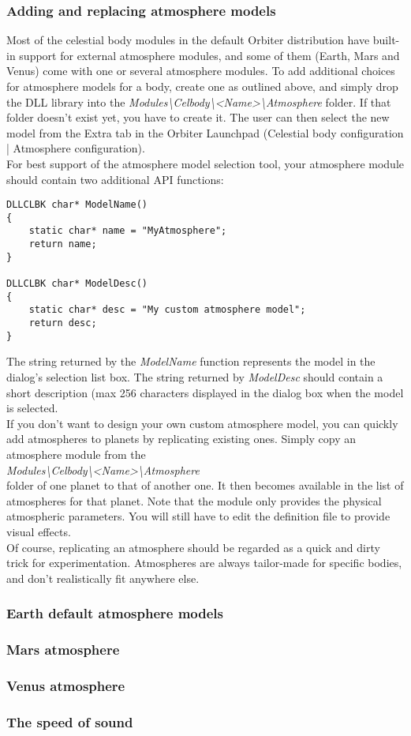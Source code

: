\documentclass[Orbiter Developer Manual.tex]{subfiles}
\begin{document}
\subsubsection{Adding and replacing atmosphere models}
Most of the celestial body modules in the default Orbiter distribution have built-in support for external atmosphere modules, and some of them (Earth, Mars and Venus) come with one or several atmosphere modules. To add additional choices for atmosphere models for a body, create one as outlined above, and simply drop the DLL library into the \textit{Modules\textbackslash Celbody\textbackslash <Name>\textbackslash Atmosphere} folder. If that folder doesn't exist yet, you have to create it. The user can then select the new model from the Extra tab in the Orbiter Launchpad (Celestial body configuration | Atmosphere configuration).\\
For best support of the atmosphere model selection tool, your atmosphere module should contain two additional API functions:

\begin{lstlisting}
DLLCLBK char* ModelName()
{
	static char* name = "MyAtmosphere";
	return name;
}

DLLCLBK char* ModelDesc()
{
	static char* desc = "My custom atmosphere model";
	return desc;
}
\end{lstlisting}

\noindent
The string returned by the \textit{ModelName} function represents the model in the dialog's selection list box. The string returned by \textit{ModelDesc} should contain a short description (max 256 characters displayed in the dialog box when the model is selected.\\
If you don't want to design your own custom atmosphere model, you can quickly add atmospheres to planets by replicating existing ones. Simply copy an atmosphere module from the\\
\textit{Modules\textbackslash Celbody\textbackslash <Name>\textbackslash Atmosphere}\\
folder of one planet to that of another one. It then becomes available in the list of atmospheres for that planet. Note that the module only provides the physical atmospheric parameters. You will still have to edit the definition file to provide visual effects.\\
Of course, replicating an atmosphere should be regarded as a quick and dirty trick for experimentation. Atmospheres are always tailor-made for specific bodies, and don't realistically fit anywhere else.


\subsubsection{Earth default atmosphere models}
\subsubsection{Mars atmosphere}
\subsubsection{Venus atmosphere}
\subsubsection{The speed of sound}
\end{document}
